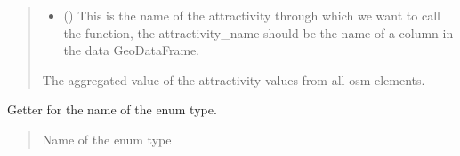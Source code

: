 \documentclass[letterpaper,10pt,english]{sphinxmanual}
\begin{document}
\begin{fulllineitems}
\begin{fulllineitems}
\begin{quote}
\begin{description}
\begin{itemize}
\item {} 
\sphinxAtStartPar
{} () \textendash{} This is the name of the attractivity through which we want to call the function,
the attractivity\_name should be the name of a column in the data GeoDataFrame.

\end{itemize}

\sphinxAtStartPar
The aggregated value of the attractivity values from all osm elements.

\sphinxAtStartPar
{}

\end{description}\end{quote}

\end{fulllineitems}


\begin{fulllineitems}
\label{\detokenize{apidoc/src.osm_configurator.model.project.calculation:src.osm_configurator.model.project.calculation.aggregation_method_enum.AggregationMethod.get_name}}
\pysigstartsignatures
{}
\pysigstopsignatures
\sphinxAtStartPar
Getter for the name of the enum type.
\begin{quote}\begin{description}
\sphinxAtStartPar
Name of the enum type

\sphinxAtStartPar
{}

\end{description}\end{quote}

\end{fulllineitems}


\end{fulllineitems}
\end{document}
